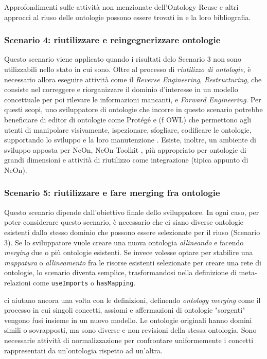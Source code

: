 Approfondimenti sulle attività non menzionate dell'Ontology Reuse e altri approcci al riuso delle ontologie possono essere trovati in \cite{carriero2020OntoReuse, caldarolaMultiStrategyApproach, ontologyEvaluation} e la loro bibliografia.
\subsubsection*{Scenario 4: riutilizzare e reingegnerizzare ontologie}
Questo scenario viene applicato quando i risultati delo Scenario 3 non sono utilizzabili nello stato in cui sono. Oltre al processo di \textit{riutilizzo di ontologie}, è necessario allora eseguire attività come il \textit{Reverse Engineering}, \textit{Restructuring}, che consiste nel correggere e riorganizzare il dominio d'interesse in un modello concettuale per poi rilevare le informazioni mancanti, e \textit{Forward Engineering}. Per questi scopi, uno sviluppatore di ontologie che incorre in questo scenario potrebbe beneficiare di editor di ontologie come Prot\'eg\'e \cite{protege} e (f OWL) \cite{fOWL} che permettono agli utenti di manipolare visivamente, ispezionare, sfogliare, codificare le ontologie, supportando lo sviluppo e la loro manutenzione \cite{alatrish2013comparison}. Esiste, inoltre, un ambiente di sviluppo apposta per NeOn, NeOn Toolkit \cite{NeOnToolkit}, più appropriato per ontologie di grandi dimensioni e attività di riutilizzo come integrazione (tipica appunto di NeOn).

\subsubsection*{Scenario 5: riutilizzare e fare merging fra ontologie}
Questo scenario dipende dall'obiettivo finale dello sviluppatore. In ogni caso, per poter considerare questo scenario, è necessario che ci siano diverse ontologie esistenti dallo stesso dominio che possono essere selezionate per il riuso (Scenario 3). Se lo sviluppatore vuole creare una nuova ontologia \textit{allineando} e facendo \textit{merging} due o più ontologie esistenti. Se invece volesse optare per stabilire una \textit{mappatura} o \textit{allineamento} fra le risorse esistenti selezionate per creare una rete di ontologie, lo scenario diventa semplice, trasformandosi nella definizione di meta-relazioni come \texttt{useImports} o \texttt{hasMapping}.

\cite{choi2006Mapping, carriero2020OntoReuse} ci aiutano ancora una volta con le definizioni, definendo \textit{ontology merging} come il processo in cui singoli concetti, assiomi e affermazioni di ontologie "sorgenti" vengono fusi insieme in un nuovo modello. Le ontologie originali hanno domini simili o sovrapposti, ma sono diverse e non revisioni della stessa ontologia. Sono necessarie attività di normalizzazione per confrontare uniformemente i concetti rappresentati da un'ontologia rispetto ad un'altra.

